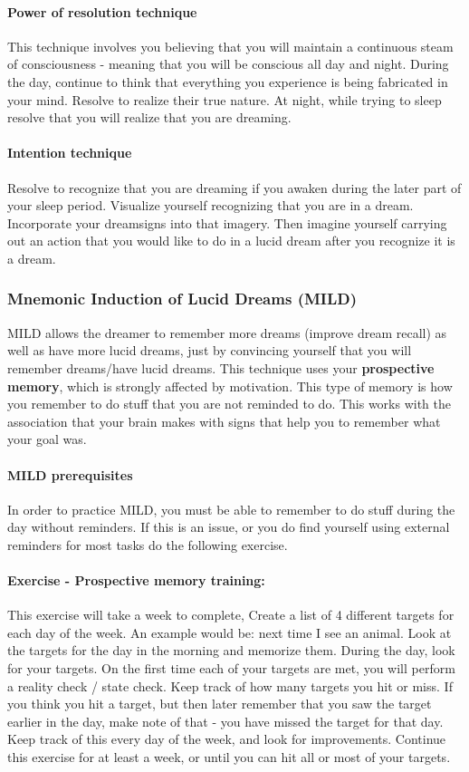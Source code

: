 \documentclass{article}
\begin{document}
\paragraph{Power of resolution technique} This technique involves you believing that you will maintain a continuous steam of consciousness - meaning that you will be conscious all day and night. During the day, continue to think that everything you experience is being fabricated in your mind. Resolve to realize their true nature. At night, while trying to sleep resolve that you will realize that you are dreaming.

\paragraph{Intention technique} Resolve to recognize that you are dreaming if you awaken during the later part of your sleep period. Visualize yourself recognizing that you are in a dream. Incorporate your dreamsigns into that imagery. Then imagine yourself carrying out an action that you would like to do in a lucid dream after you recognize it is a dream.

\subsubsection{Mnemonic Induction of Lucid Dreams (MILD)}
MILD allows the dreamer to remember more dreams (improve dream recall) as well as have more lucid dreams, just by convincing yourself that you will remember dreams/have lucid dreams. This technique uses your \textbf{prospective memory}, which is strongly affected by motivation. This type of memory is how you remember to do stuff that you are not reminded to do. This works with the association that your brain makes with signs that help you to remember what your goal was.

\paragraph{MILD prerequisites} In order to practice MILD, you must be able to remember to do stuff during the day without reminders. If this is an issue, or you do find yourself using external reminders for most tasks do the following exercise.

\paragraph{Exercise - Prospective memory training:} This exercise will take a week to complete, Create a list of 4 different targets for each day of the week. An example would be: next time I see an animal. Look at the targets for the day in the morning and memorize them. During the day, look for your targets. On the first time each of your targets are met, you will perform a reality check / state check. Keep track of how many targets you hit or miss. If you think you hit a target, but then later remember that you saw the target earlier in the day, make note of that - you have missed the target for that day. Keep track of this every day of the week, and look for improvements. Continue this exercise for at least a week, or until you can hit all or most of your targets.
\end{document}
